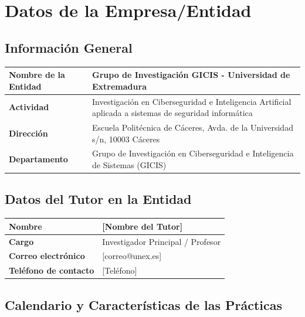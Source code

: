 \documentclass[12pt,a4paper]{article}
\begin{document}
\section{Datos de la Empresa/Entidad}

\subsection{Información General}

\begin{table}[h]
\centering
\begin{tabularx}{\textwidth}{|l|X|}
\hline
\textbf{Nombre de la Entidad} & Grupo de Investigación GICIS - Universidad de Extremadura \\
\hline
\textbf{Actividad} & Investigación en Ciberseguridad e Inteligencia Artificial aplicada a sistemas de seguridad informática \\
\hline
\textbf{Dirección} & Escuela Politécnica de Cáceres, Avda. de la Universidad s/n, 10003 Cáceres \\
\hline
\textbf{Departamento} & Grupo de Investigación en Ciberseguridad e Inteligencia de Sistemas (GICIS) \\
\hline
\end{tabularx}
\end{table}

\subsection{Datos del Tutor en la Entidad}

\begin{table}[h]
\centering
\begin{tabularx}{\textwidth}{|l|X|}
\hline
\textbf{Nombre} & [Nombre del Tutor] \\
\hline
\textbf{Cargo} & Investigador Principal / Profesor \\
\hline
\textbf{Correo electrónico} & [correo@unex.es] \\
\hline
\textbf{Teléfono de contacto} & [Teléfono] \\
\hline
\end{tabularx}
\end{table}

\subsection{Calendario y Características de las Prácticas}
\end{document}
